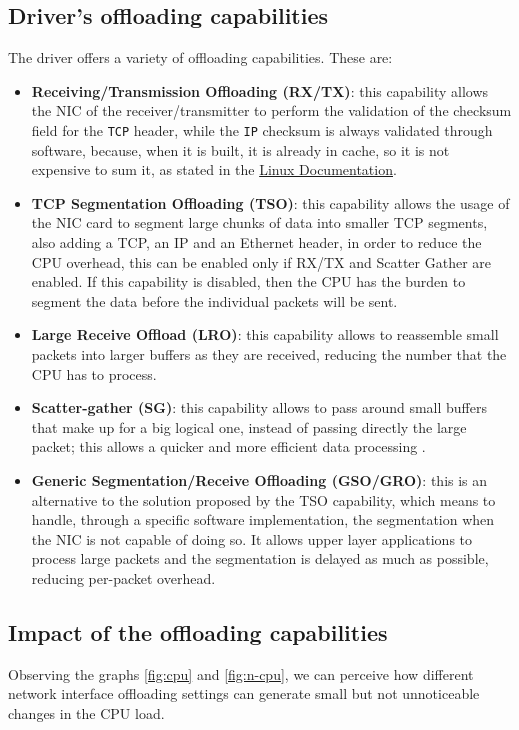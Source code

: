 \documentclass{exam}
\begin{document}
\subsection{Driver's offloading capabilities}
The driver offers a variety of offloading capabilities. These are:
\begin{itemize}
    \item \textbf{Receiving/Transmission Offloading (RX/TX)}: this capability allows the NIC of the receiver/transmitter to perform the validation of the checksum field for the \texttt{TCP} header, while the \texttt{IP} checksum is always validated through software, because, when it is built, it is already in cache, so it is not expensive to sum it, as stated in the \href{https://www.kernel.org/doc/html/next/networking/checksum-offloads.html}{Linux Documentation}.
    \item \textbf{TCP Segmentation Offloading (TSO)}: this capability allows the usage of the NIC card to segment large chunks of data into smaller TCP segments, also adding a TCP, an IP and an Ethernet header, in order to reduce the CPU overhead, this can be enabled only if RX/TX and Scatter Gather are enabled. If this capability is disabled, then the CPU has the burden to segment the data before the individual packets will be sent.
    \item \textbf{Large Receive Offload (LRO)}: this capability allows to reassemble small packets into larger buffers as they are received, reducing the number that the CPU has to process.
    \item \textbf{Scatter-gather (SG)}: this capability allows to pass around small buffers that make up for a big logical one, instead of passing directly the large packet; this allows a quicker and more efficient data processing .
    \item \textbf{Generic Segmentation/Receive Offloading (GSO/GRO)}: this is an alternative to the solution proposed by the TSO capability, which means to handle, through a specific software implementation, the segmentation when the NIC is not capable of doing so. It allows upper layer applications to process large packets and the segmentation is delayed as much as possible, reducing per-packet overhead.
\end{itemize}

\subsection{Impact of the offloading capabilities}
Observing the graphs \ref{fig:cpu} and \ref{fig:n-cpu}, we can perceive how different network interface offloading settings can generate small but not unnoticeable changes in the CPU load. 
\end{document}
